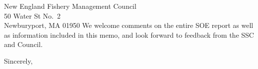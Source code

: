 \documentclass[10pt,]{letter}
\begin{document}
\begin{letter}{New England Fishery Management Council\\50 Water St
No.~2\\Newburyport, MA 01950}
We welcome comments on the entire SOE report as well as information
included in this memo, and look forward to feedback from the SSC and
Council.

\longindentation=0pt
\closing{Sincerely,}

\end{letter}
\end{document}
